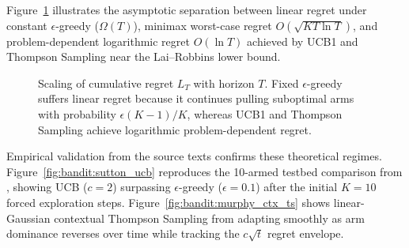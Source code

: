 \documentclass[../../../../master.tex]{subfiles}
\begin{document}
Figure~\ref{fig:bandit:regret_curves} illustrates the asymptotic separation between linear regret under constant $\epsilon$-greedy ($\Omega(T)$), minimax worst-case regret $O(\sqrt{KT\ln T})$, and problem-dependent logarithmic regret $O(\ln T)$ achieved by UCB1 and Thompson Sampling near the Lai--Robbins lower bound.

\begin{figure}[htbp]
\centering
{}
\caption{Scaling of cumulative regret $L_T$ with horizon $T$. Fixed $\epsilon$-greedy suffers linear regret because it continues pulling suboptimal arms with probability $\epsilon(K-1)/K$, whereas UCB1 and Thompson Sampling achieve logarithmic problem-dependent regret.}\label{fig:bandit:regret_curves}
\end{figure}

Empirical validation from the source texts confirms these theoretical regimes. Figure~\ref{fig:bandit:sutton_ucb} reproduces the 10-armed testbed comparison from , showing UCB ($c=2$) surpassing $\epsilon$-greedy ($\epsilon=0.1$) after the initial $K=10$ forced exploration steps. Figure~\ref{fig:bandit:murphy_ctx_ts} shows linear-Gaussian contextual Thompson Sampling from  adapting smoothly as arm dominance reverses over time while tracking the $c\sqrt{t}$ regret envelope.
\end{document}
